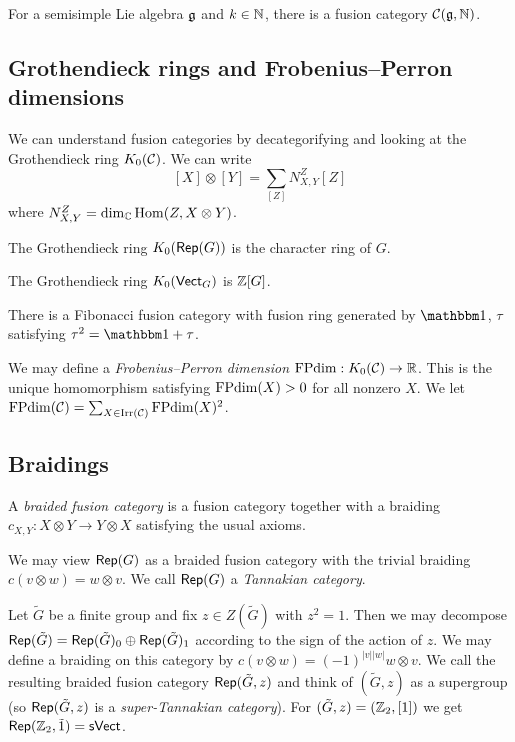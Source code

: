 \documentclass{amsart}
\begin{document}
\begin{ex}
  For a semisimple Lie algebra $\mathfrak{g}$ and $k \in \mathbb{N}$, there is a fusion category $\mathcal{C}(\mathfrak{g}, \mathbb{N})$.
\end{ex}

\subsection{Grothendieck rings and Frobenius--Perron dimensions}

We can understand fusion categories by decategorifying and looking at the Grothendieck ring $K_0(\mathcal{C})$.
We can write
\[
  [X] \otimes [Y] = \sum_{[Z]} N_{X,Y}^{Z} [Z]
\]
where $N_{X,Y}^Z = \dim_{\mathbb{C}} \operatorname{Hom}(Z, X \otimes Y)$.

\begin{ex}
  The Grothendieck ring $K_0(\operatorname{\mathsf{Rep}}(G))$ is the character ring of $G$.
\end{ex}

\begin{ex}
  The Grothendieck ring $K_0(\mathsf{Vect}_G)$ is $\mathbb{Z}[G]$.
\end{ex}

\begin{ex}
  There is a Fibonacci fusion category with fusion ring generated by $\onebb$, $\tau$ satisfying $\tau^2 = \onebb + \tau$.
\end{ex}

We may define a \emph{Frobenius--Perron dimension} $\operatorname{FPdim}: K_0(\mathcal{C}) \to \mathbb{R}$.
This is the unique homomorphism satisfying $\operatorname{FPdim}(X) > 0$ for all nonzero $X$.
We let $\operatorname{FPdim}(\mathcal{C}) = \sum_{X \in \operatorname{Irr}(\mathcal{C})} \operatorname{FPdim}(X)^2$.

\subsection{Braidings}

A \emph{braided fusion category} is a fusion category together with a braiding $c_{X,Y}: X \otimes Y \to Y \otimes X$ satisfying the usual axioms.

\begin{ex}
  We may view $\operatorname{\mathsf{Rep}}(G)$ as a braided fusion category with the trivial braiding $c(v \otimes w) = w \otimes v$.
  We call $\operatorname{\mathsf{Rep}}(G)$ a \emph{Tannakian category}.
\end{ex}

\begin{ex}
  Let $\tilde{G}$ be a finite group and fix $z \in Z(\tilde{G})$ with $z^2 = 1$.
  Then we may decompose $\operatorname{\mathsf{Rep}}(\tilde{G}) = \operatorname{\mathsf{Rep}}(\tilde{G})_0 \oplus \operatorname{\mathsf{Rep}}(\tilde{G})_1$ according to the sign of the action of $z$.
  We may define a braiding on this category by $c(v \otimes w) = (-1)^{|v| |w|} w \otimes v$.
  We call the resulting braided fusion category $\operatorname{\mathsf{Rep}}(\tilde{G}, z)$ and think of $(\tilde{G}, z)$ as a supergroup (so $\operatorname{\mathsf{Rep}}(\tilde{G}, z)$ is a \emph{super-Tannakian category}).
  For $(\tilde{G}, z) = (\mathbb{Z}_2, [1])$ we get $\operatorname{\mathsf{Rep}}(\mathbb{Z}_2, \tilde{1}) = \mathsf{sVect}$.
\end{ex}
\end{document}
